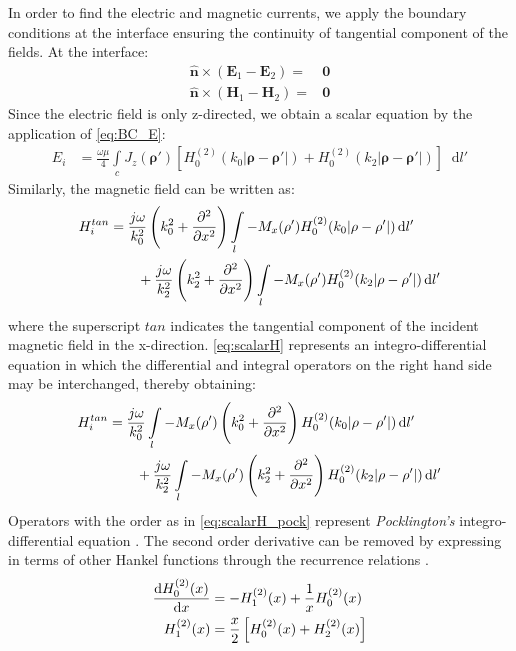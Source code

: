 \documentclass[11pt]{article}
\renewcommand{\v}[1]{\mathbf{#1}} %
\renewcommand{\O}{\omega}  %
\renewcommand{\u}{\mu}  %
\newcommand{\p}{\rho}  %
\newcommand{\x}{\times}  %
\renewcommand{\^}{\hat}  %
\newcommand*\diff{\mathop{}\!\mathrm{d}} %
\begin{document}
In order to find the electric and magnetic currents, we apply the boundary conditions at the interface ensuring the continuity of tangential component of the fields. At the interface:
%
\begin{subequations}
  \begin{align}
    \hat{\v n} \x (\v E_1 - \v E_2) ={}& \v 0
    \label{eq:BC_E}\\
    \hat{\v n} \x (\v H_1 - \v H_2) ={}& \v 0
    \label{eq:BC_H}
  \end{align}
  \label{eq:BC}
\end{subequations}
%
Since the electric field is only z-directed, we obtain a scalar equation by the application of \eqref{eq:BC_E}:
%
\begin{align}
  E_i &= \frac{\O \u}{4} \int\limits_c J_z(\v \p') \left[ H_0^{(2)}(k_0 |\v \p - \v \p'|) + H_0^{(2)}(k_2 |\v \p - \v \p'|)\right] \diff{l'}
  \label{eq:scalarE}
\end{align}
%
Similarly, the magnetic field can be written as:
%
\begin{align}
  H_i^{tan} &=  \frac{j \O}{k_0^2}\left(k_0^2 +  \pdv[2]{}{x} \right) \int\limits_{l} -M_x(\v \p') H_0^{(2)}(k_0 |\v \p - \v \p'|) \diff{l'} \notag\\
  &\qquad + \frac{j \O}{k_2^2}\left(k_2^2 +  \pdv[2]{}{x} \right) \int\limits_{l} -M_x(\v \p') H_0^{(2)}(k_2 |\v \p - \v \p'|) \diff{l'}
  \label{eq:scalarH}
\end{align}
%
where the superscript $tan$ indicates the tangential component of the incident magnetic field in the x-direction. \eqref{eq:scalarH} represents an integro-differential equation in which the differential and integral operators on the right hand side may be interchanged, thereby obtaining:
%
\begin{align}
  H_i^{tan} &=  \frac{j \O}{k_0^2} \int\limits_{l} -M_x(\v \p') \left(k_0^2 +  \pdv[2]{}{x} \right) H_0^{(2)}(k_0 |\v \p - \v \p'|) \diff{l'} \notag\\
  &\qquad + \frac{j \O}{k_2^2} \int\limits_{l} -M_x(\v \p') \left(k_2^2 +  \pdv[2]{}{x} \right) H_0^{(2)}(k_2 |\v \p - \v \p'|) \diff{l'}
  \label{eq:scalarH_pock}
\end{align}
%
Operators with the order as in \eqref{eq:scalarH_pock} represent \emph{Pocklington's} integro-differential equation \cite{}. The second order derivative can be removed by expressing in terms of other Hankel functions through the recurrence relations \cite[p. 361]{}.
%
\begin{subequations}
  \begin{align}
    \dv{H_0^{(2)}(x)}{x} &= -H_{1}^{(2)}(x) + \frac{1}{x} H_0^{(2)}(x)
    \label{eq:Hankel_ID1}\\
    H_{1}^{(2)}(x)  &= \frac{x}{2} \left[H_{0}^{(2)}(x) + H_{2}^{(2)}(x)\right]
    \label{eq:Hankel_ID2}
  \end{align}
  \label{eq:Hankel_ID}
\end{subequations}
\end{document}
